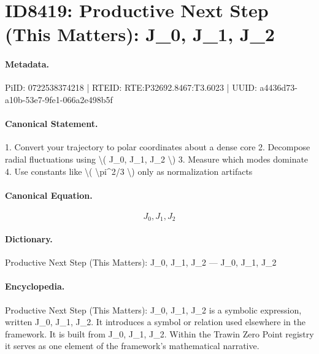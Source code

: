 \section*{ID8419: Productive Next Step (This Matters): J\_0, J\_1, J\_2}
\paragraph{Metadata.}
PiID: 0722538374218 | RTEID: RTE:P32692.8467:T3.6023 | UUID: a4436d73-a10b-53e7-9fe1-066a2e498b5f

\paragraph{Canonical Statement.}
1. Convert your trajectory to polar coordinates about a dense core 2. Decompose radial fluctuations using \textbackslash{}( J\_0, J\_1, J\_2 \textbackslash{}) 3. Measure which modes dominate 4. Use constants like \textbackslash{}( \textbackslash{}pi\textasciicircum{}2/3 \textbackslash{}) only as normalization artifacts

\paragraph{Canonical Equation.}
\[
J_0, J_1, J_2
\]

\paragraph{Dictionary.}
Productive Next Step (This Matters): J\_0, J\_1, J\_2 — J\_0, J\_1, J\_2

\paragraph{Encyclopedia.}
Productive Next Step (This Matters): J\_0, J\_1, J\_2 is a symbolic expression, written J\_0, J\_1, J\_2. It introduces a symbol or relation used elsewhere in the framework. It is built from J\_0, J\_1, J\_2. Within the Trawin Zero Point registry it serves as one element of the framework's mathematical narrative.

